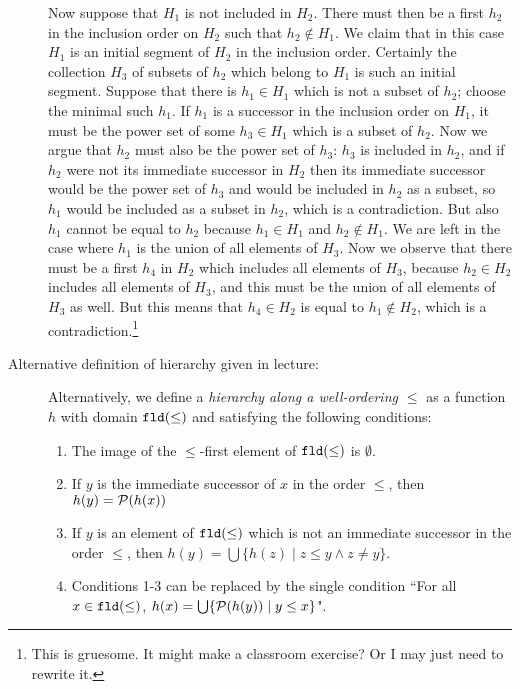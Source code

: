 \documentclass[12pt]{book}
\begin{document}
\begin{description}
Now suppose that $H_1$ is not included in $H_2$.  There must then be a first $h_2$ in the inclusion order on $H_2$ such that $h_2 \not\in H_1$.
We claim that in this case $H_1$ is an initial segment of $H_2$ in the inclusion order.  Certainly the collection $H_3$ of subsets of $h_2$ which belong to
$H_1$ is such an initial segment.  Suppose that there is $h_1 \in H_1$ which is not a subset of $h_2$;  choose the minimal such $h_1$.  If $h_1$ is
a successor in the inclusion order on $H_1$, it must be the power set of some $h_3 \in H_1$ which is a subset of $h_2$.  Now we argue that $h_2$
must also be the power set of $h_3$:  $h_3$ is included in $h_2$, and if $h_2$ were not its immediate successor in $H_2$ then its immediate successor would be the power set of $h_3$ and would be included in $h_2$ as a subset, so $h_1$ would be included as a subset in $h_2$, which is a contradiction.  But also $h_1$ cannot be equal to $h_2$ because $h_1 \in H_1$ and $h_2 \not\in H_1$.  We are left in the case where $h_1$ is the union of all elements of $H_3$.  Now we observe that there must be a first $h_4$ in $H_2$ which includes all elements of $H_3$, because $h_2 \in H_2$ includes all elements of $H_3$, and this
must be the union of all elements of $H_3$ as well.  But this means that $h_4 \in H_2$ is equal to $h_1 \not\in H_2$, which is a contradiction.\footnote{This is gruesome.  It might make a classroom exercise?  Or I may just need to rewrite it.}

\newpage

\item[Alternative definition of hierarchy given in lecture:]  Alternatively, we define a {\em hierarchy along a well-ordering $\leq$\/} as a function $h$ with domain ${\tt fld}(\leq)$
and satisfying the following conditions:

\begin{enumerate}

\item The image of the $\leq$-first element of ${\tt fld}(\leq)$ is $\emptyset$.

\item If $y$ is the immediate successor of $x$ in the order $\leq$, then $h(y) = {\cal P}(h(x))$

\item If $y$ is an element of ${\tt fld}(\leq)$ which is not an immediate successor in the order $\leq$, then $h(y) = \bigcup \{h(z) \mid z \leq y \wedge z \neq y\}$.

\item Conditions 1-3 can be replaced by the single condition ``For all $x \in {\tt fld}(\leq)$, $h(x) = \bigcup \{{\cal P}(h(y)) \mid y \leq x\}$".


\end{enumerate}
\end{description}
\end{document}
